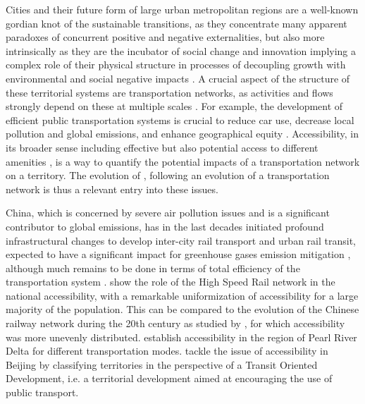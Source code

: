 Cities and their future form of large urban metropolitan regions are a well-known gordian knot of the sustainable transitions, as they concentrate many apparent paradoxes of concurrent positive and negative externalities, but also more intrinsically as they are the incubator of social change and innovation \citep{pumain2009innovation} implying a complex role of their physical structure in processes of decoupling growth with environmental and social negative impacts \citep{bergeaud2018bel}. A crucial aspect of the structure of these territorial systems are transportation networks, as activities and flows strongly depend on these at multiple scales \citep{raimbault2018caracterisation}. For example, the development of efficient public transportation systems is crucial to reduce car use, decrease local pollution and global emissions, and enhance geographical equity \citep{sinha2003sustainability}. Accessibility, in its broader sense including effective but also potential access to different amenities \citep{bavoux2005geographie}, is a way to quantify the potential impacts of a transportation network on a territory. The evolution of , following an evolution of a transportation network is thus a relevant entry into these issues.

China, which is concerned by severe air pollution issues and is a significant contributor to global emissions, has in the last decades initiated profound infrastructural changes to develop inter-city rail transport and urban rail transit, expected to have a significant impact for greenhouse gases emission mitigation \citep{han2008system}, although much remains to be done in terms of total efficiency of the transportation system \citep{chang2013environmental}. \cite{jiao2014impacts} show the role of the High Speed Rail network in the national accessibility, with a remarkable uniformization of accessibility  for a large majority of the population.  This can be compared to the evolution of the Chinese railway network during the 20th century as studied by \cite{wang2009spatiotemporal}, for which accessibility was more unevenly distributed. \cite{hou2011transport} establish  accessibility  in the region of Pearl River Delta for different transportation modes. \cite{lyu2016developing} tackle the issue of accessibility in Beijing by classifying territories in the perspective of a Transit Oriented Development, i.e. a territorial development aimed at encouraging the use of public transport.


